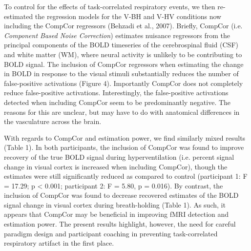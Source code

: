 \documentclass[9pt]{NEU502b-fmri}
\begin{document}
To control for the effects of task-correlated respiratory events, we then re-estimated the regression models for the V-BH and V-HV conditions now including the CompCor regressors (Behzadi et al., 2007). Briefly, CompCor (i.e. \textit{Component Based Noise Correction}) estimates nuisance regressors from the principal components of the BOLD timeseries of the cerebrospinal fluid (CSF) and white matter (WM), where neural activity is unlikely to be contributing to BOLD signal.  The inclusion of CompCor regressors when estimating the change in BOLD in response to the visual stimuli substantially reduces the number of false-positive activations (Figure 4). Importantly CompCor does not completely reduce false-positive activations. Interestingly, the false-positive activations detected when including CompCor seem to be predominantly negative. The reasons for this are unclear, but may have to do with anatomical differences in the vasculature across the brain. 

With regards to CompCor and estimation power, we find similarly mixed results (Table 1). In both participants, the inclusion of CompCor was found to improve recovery of the true BOLD signal during hyperventilation (i.e. percent signal change in visual cortex is increased when including CompCor), though the estimates were still significantly reduced as compared to control (participant 1: F = 17.29; p < 0.001; participant 2: F = 5.80, p = 0.016). By contrast, the inclusion of CompCor was found to decrease recovered estimates of the BOLD signal change in visual cortex during breath-holding (Table 1). As such, it appears that CompCor may be beneficial in improving fMRI detection and estimation power. The present results highlight, however, the need for careful paradigm design and participant coaching in preventing task-correlated respiratory artifact in the first place.
\end{document}
